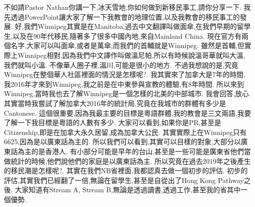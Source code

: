 \documentclass{book}
\begin{document}
不如請Pastor Nathan你講一下,冰天雪地,你如何做到新移民事工,請你分享一下.
我先透過PowerPoint讓大家了解一下我教會的地理位置,以及我教會的移民事工的發展.
好,我們Winnipeg其實是在Manitoba,過去中文翻譯叫做面傘,在我們早期的留學生,以及在90年代移民,隨著多了很多中國內地,來自Mainland China.
現在官方有兩個名字,大家可以叫面傘,或者是萬傘,而我們的首輔就是Winnipeg.
雖然是首輔,但實際上Winnipeg相對,因為我們中文譯作叫做溫尼帕,所以有時候說溫哥華就叫大溫,我們就叫小溫.
不像華人圈子裡,溫川,可能是很小的地方.
不過我想說的是,究竟Winnipeg在整個華人社區裡面的情況是怎樣呢?.
我其實來了加拿大是7年的時間,我2016年才來到Winnipeg,我之前是在中東參與宣教的體驗,有8年時間.
所以來到Winnipeg,當時我也去了解Winnipeg是一個怎樣的北美的中部城市.
我會回答,放心.
其實當時我嘗試了解加拿大2016年的統計局,究竟在我城市的群體有多少是Cantonese.
這個很重要,因為我最主要的目標是粵語群體,我的教會是三文兩語,我要了解一下我目標是粵語的人數有多少.
大家可以看到,如果你是PR,甚至是Citizenship,即是在加拿大永久居留,成為加拿大公民.
其實實際上在Winnipeg只有6625,因為是以廣東話為主的.
所以我們可以看到,其實可以目樣的對象,大部分以廣東話為主的是香港人.
有小部分可能是早年的台山,甚至是一些可能是廣東省他們當做統計的時候,他們說他們的家庭是以廣東話為主.
所以究竟在過去2019年之後產生的移民潮是怎樣呢?.
其實在我們NB省裡面,我都認真去做一個初步的評估.
初步的評估,其實我們已經翻了一倍,無論在留學生,甚至是自從出了Hong Kong Pathway之後.
大家知道有Stream A, Stream B,無論是透過讀書,透過工作,甚至我的省其中一個優勢.
\end{document}

